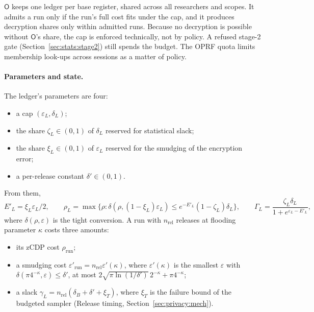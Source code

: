 \documentclass[11pt]{article}
\theoremstyle{definition}
\theoremstyle{plain}
\newcommand{\Party}[1]{\textsf{#1}}
\newcommand{\Op}{\Party{O}}
\begin{document}
$\Op$ keeps one ledger per base register, shared across all researchers and scopes. It admits a run only if the run's full cost fits under the cap, and it produces decryption shares only within admitted runs. Because no decryption is possible without $\Op$'s share, the cap is enforced technically, not by policy. A refused stage-2 gate (Section~\ref{sec:stats:stage2}) still spends the budget. The OPRF quota limits membership look-ups across sessions as a matter of policy.

\paragraph{Parameters and state.} The ledger's parameters are four:
\begin{itemize}[noitemsep]
  \item a cap $(\varepsilon_L, \delta_L)$;
  \item the share $\zeta_L \in (0, 1)$ of $\delta_L$ reserved for statistical slack;
  \item the share $\xi_L \in (0, 1)$ of $\varepsilon_L$ reserved for the smudging of the encryption error;
  \item a per-release constant $\delta' \in (0, 1)$.
\end{itemize}
From them,
\[
  E'_L = \xi_L\varepsilon_L/2, \qquad
  \rho_L = \max\{\rho : \delta(\rho, (1 - \xi_L)\varepsilon_L) \le e^{-E'_L}(1 - \zeta_L)\delta_L\}, \qquad
  \Gamma_L = \frac{\zeta_L\delta_L}{1 + e^{\varepsilon_L - E'_L}} ,
\]
where $\delta(\rho, \varepsilon)$ is the tight conversion. A run with $n_{\mathrm{rel}}$ releases at flooding parameter $\kappa$ costs three amounts:
\begin{itemize}[noitemsep]
  \item its zCDP cost $\rho_{\mathrm{run}}$;
  \item a smudging cost $\varepsilon'_{\mathrm{run}} = n_{\mathrm{rel}}\varepsilon'(\kappa)$, where $\varepsilon'(\kappa)$ is the smallest $\varepsilon$ with $\delta(\pi 4^{-\kappa}, \varepsilon) \le \delta'$, at most $2\sqrt{\pi\ln(1/\delta')}\,2^{-\kappa} + \pi 4^{-\kappa}$;
  \item a slack $\gamma_L = n_{\mathrm{rel}}(\delta_B + \delta' + \xi_T)$, where $\xi_T$ is the failure bound of the budgeted sampler (Release timing, Section~\ref{sec:privacy:mech}).
\end{itemize}
\end{document}
